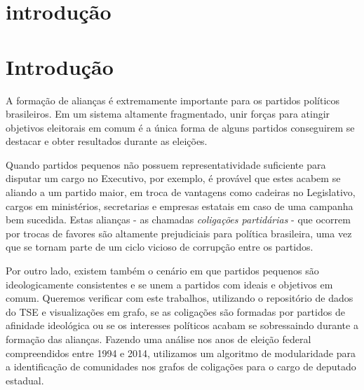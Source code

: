 
\chapter{introdução}
\label{cap1_intro}
\setcounter{page}{6} %



\chapter{Introdu{\c   c}{\~a}o}
\label{introducao}
\setcounter{page}{6} %



A formação de alianças é extremamente importante para os partidos políticos brasileiros. Em um sistema altamente fragmentado, unir forças para atingir objetivos eleitorais em comum é a única forma de alguns partidos conseguirem se destacar e obter resultados durante as eleições.

Quando partidos pequenos não possuem representatividade suficiente para disputar um cargo no Executivo, por exemplo, é provável que estes acabem se aliando a um partido maior, em troca de vantagens como cadeiras no Legislativo, cargos em ministérios, secretarias e empresas estatais em caso de uma campanha bem sucedida. Estas alianças - as chamadas \emph{coligações partidárias} - que ocorrem por trocas de favores são altamente prejudiciais para política brasileira, uma vez que se tornam parte de um ciclo vicioso de corrupção entre os partidos.

Por outro lado, existem também o cenário em que partidos pequenos são ideologicamente consistentes e se unem a partidos com ideais e objetivos em comum. Queremos verificar com este trabalhos, utilizando o repositório de dados do TSE e visualizações em grafo, se as coligações são formadas por partidos de afinidade ideológica ou se os interesses políticos acabam se sobressaindo durante a formação das alianças. Fazendo uma análise nos anos de eleição federal compreendidos entre 1994 e 2014, utilizamos um algoritmo de modularidade para a identificação de comunidades nos grafos de coligações para o cargo de deputado estadual.

